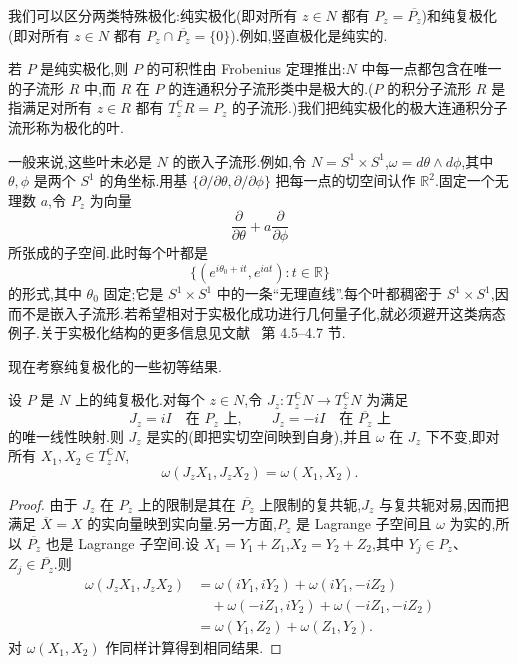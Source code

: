 我们可以区分两类特殊极化:纯实极化(即对所有 $z\in N$ 都有 $P_z=\overline{P_z}$)和纯复极化(即对所有 $z\in N$ 都有 $P_z\cap\overline{P_z}=\{0\}$).例如,竖直极化是纯实的.

若 $P$ 是纯实极化,则 $P$ 的可积性由 Frobenius 定理推出:$N$ 中每一点都包含在唯一的子流形 $R$ 中,而 $R$ 在 $P$ 的连通积分子流形类中是极大的.($P$ 的积分子流形 $R$ 是指满足对所有 $z\in R$ 都有 $T_z^{\mathbb C} R=P_z$ 的子流形.)我们把纯实极化的极大连通积分子流形称为极化的叶.

一般来说,这些叶未必是 $N$ 的嵌入子流形.例如,令 $N=S^1\times S^1$,$\omega=d\theta\wedge d\phi$,其中 $\theta,\phi$ 是两个 $S^1$ 的角坐标.用基 $\{\partial/\partial\theta,\partial/\partial\phi\}$ 把每一点的切空间认作 $\mathbb R^2$.固定一个无理数 $a$,令 $P_z$ 为向量
\[
 \frac{\partial}{\partial\theta}+a\frac{\partial}{\partial\phi}
\]
所张成的子空间.此时每个叶都是
\[
 \{(e^{i\theta_0+it},e^{iat}):t\in\mathbb R\}
\]
的形式,其中 $\theta_0$ 固定;它是 $S^1\times S^1$ 中的一条“无理直线”.每个叶都稠密于 $S^1\times S^1$,因而不是嵌入子流形.若希望相对于实极化成功进行几何量子化,就必须避开这类病态例子.关于实极化结构的更多信息见文献~\cite{Woodhouse1992} 第 4.5--4.7 节.

现在考察纯复极化的一些初等结果.

\begin{proposition}[纯复极化给出的复结构]
\label{prop:complex-polarization-complex-structure}
设 $P$ 是 $N$ 上的纯复极化.对每个 $z\in N$,令 $J_z:T_z^{\mathbb C} N\to T_z^{\mathbb C} N$ 为满足
\[
 J_z=iI\quad\text{在 }P_z\text{ 上},\qquad
 J_z=-iI\quad\text{在 }\overline{P_z}\text{ 上}
\]
的唯一线性映射.则 $J_z$ 是实的(即把实切空间映到自身),并且 $\omega$ 在 $J_z$ 下不变,即对所有 $X_1,X_2\in T_z^{\mathbb C} N$,
\[
 \omega(J_zX_1,J_zX_2)=\omega(X_1,X_2).
\]
\end{proposition}

\begin{proof}
由于 $J_z$ 在 $P_z$ 上的限制是其在 $\overline{P_z}$ 上限制的复共轭,$J_z$ 与复共轭对易,因而把满足 $\overline X=X$ 的实向量映到实向量.另一方面,$P_z$ 是 Lagrange 子空间且 $\omega$ 为实的,所以 $\overline{P_z}$ 也是 Lagrange 子空间.设 $X_1=Y_1+Z_1$,$X_2=Y_2+Z_2$,其中 $Y_j\in P_z$、$Z_j\in\overline{P_z}$.则
\[
\begin{aligned}
 \omega(J_zX_1,J_zX_2)
 &=\omega(iY_1,iY_2)+\omega(iY_1,-iZ_2)\\
 &\quad+\omega(-iZ_1,iY_2)+\omega(-iZ_1,-iZ_2)\\
 &=\omega(Y_1,Z_2)+\omega(Z_1,Y_2).
\end{aligned}
\]
对 $\omega(X_1,X_2)$ 作同样计算得到相同结果.
\end{proof}

